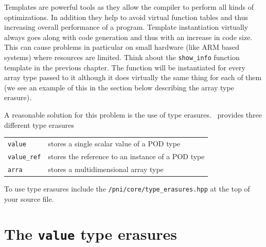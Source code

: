 
Templates are powerful tools as they allow the compiler to perform all kinds of
optimizations. In addition they help to avoid virtual function tables and thus
increasing overall performance of a program. 
Template instantiation virtually always goes along with code generation and thus
with an increase in code size. This can cause problems in particular on small
hardware (like ARM based systems) where resources are limited.
Think about the {\tt show\_info} function template in the previous chapter. The
function will be instantiated for every array type passed to it although it does
virtually the same thing for each of them (we see an example of this in the
section below describing the array type erasure). 

A reasonable solution for this problem is the use of type erasures. 
\libpnicore\ provides three different type erasures
\begin{center}
\begin{tabular}{l | l}
{\tt value} & stores a single scalar value of a POD type \\
{\tt value\_ref} & stores the reference to an instance of a POD type \\
{\tt arra} & stores a multidimensional array type 
\end{tabular}
\end{center}
To use type erasures include the {\tt /pni/core/type\_erasures.hpp} at the top of
your source file.

\section{The {\tt value} type erasures}

